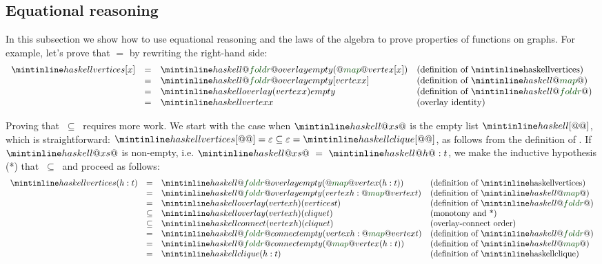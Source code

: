 \subsection{Equational reasoning}\label{sub-reasoning}

In this subsection we show how to use equational reasoning and the laws
of the algebra to prove properties of functions on graphs.
For example, let's prove that  $=$  by rewriting
the right-hand side:
\[
\begin{array}{rcll}
\hs{vertices [x]} & = & \hs{@\std{foldr}@ overlay empty (@\std{map}@ vertex [x])} & \text{(definition of \hs{vertices})}\\
 & = & \hs{@\std{foldr}@ overlay empty [vertex x]} & \text{(definition of }\hs{@\std{map}@}\text{)}\\
 & = & \hs{overlay (vertex x) empty} & \text{(definition of }\hs{@\std{foldr}@}\text{)}\\
 & = & \hs{vertex x} & \text{(overlay identity)}\\
\end{array}
\]

Proving that  $\ \subseteq\ $  requires more work.
We start with the case when $\hs{@\blk{xs}@}$ is the empty list $\hs{[@@]}$,
which is straightforward:
$\hs{vertices [@@]} = \varepsilon \subseteq \varepsilon = \hs{clique [@@]}$,
as follows from the definition of .
If $\hs{@\blk{xs}@}$ is non-empty, i.e. $\hs{@\blk{xs}@}\ =\ \hs{@\blk{h}@:t}$,
we make the inductive hypothesis (*) that
 $\ \subseteq\ $  and proceed as follows:
\[
\begin{array}{rcll}
\hs{vertices (h:t)} & = & \hs{@\std{foldr}@ overlay empty (@\std{map}@ vertex (h:t))} & \text{(definition of \hs{vertices})}\\
 & = & \hs{@\std{foldr}@ overlay empty (vertex h : @\std{map}@ vertex t)} & \text{(definition of }\hs{@\std{map}@}\text{)}\\
 & = & \hs{overlay (vertex h) (vertices t)} & \text{(definition of }\hs{@\std{foldr}@}\text{)}\\
 & \subseteq & \hs{overlay (vertex h) (clique t)} & \text{(monotony and *)}\\
 & \subseteq & \hs{connect (vertex h) (clique t)} & \text{(overlay-connect order)}\\
 & = & \hs{@\std{foldr}@ connect empty (vertex h : @\std{map}@ vertex t)} & \text{(definition of }\hs{@\std{foldr}@}\text{)}\\
 & = & \hs{@\std{foldr}@ connect empty (@\std{map}@ vertex (h:t))} & \text{(definition of }\hs{@\std{map}@}\text{)}\\
 & = & \hs{clique (h:t)} & \text{(definition of \hs{clique})}\\
\end{array}
\]


